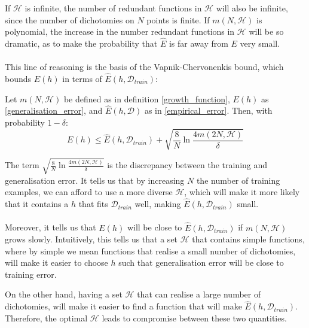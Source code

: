 If $\mathcal{H}$ is infinite, the number of redundant functions in $\mathcal{H}$ will also be infinite, since the number of dichotomies on $N$ points is finite. If $m(N, \mathcal{H})$ is polynomial, the increase in the number redundant functions in $\mathcal{H}$ will be so dramatic, as to make the probability that $\hat{E}$ is far away from $E$ very small.
\\\\
 This line of reasoning is the basis of the Vapnik-Chervonenkis bound, which bounds $E(h)$ in terms of $\hat{E}(h, \mathcal{D}_{train})$:

\begin{theorem}
	\label{vc_bound}
	Let $m(N, \mathcal{H})$ be defined as in definition \ref{growth_function}, $E(h)$ as \ref{generalisation_error}, and $\hat{E}(h, \mathcal{D})$ as in \ref{empirical_error}. Then, with probability $1 - \delta$:
	$$
	E(h) \leq \hat{E}(h, \mathcal{D}_{train}) + \sqrt{\frac{8}{N}\ln \frac{4m(2N, \mathcal{H})}{\delta}}
	$$
\end{theorem}

The term $\sqrt{\frac{8}{N}\ln \frac{4m(2N, \mathcal{H})}{\delta}}$ is the discrepancy between the training and generalisation error. It tells us that by increasing $N$ the number of training examples, we can afford to use a more diverse $\mathcal{H}$, which will make it more likely that it contains a $h$ that fits $\mathcal{D}_{train}$ well, making $\hat{E}(h, \mathcal{D}_{train})$ small.
\\\\
Moreover, it tells us that $E(h)$ will be close to $\hat{E}(h, \mathcal{D}_{train})$ if $m(N, \mathcal{H})$ grows slowly. Intuitively, this tells us that a set $\mathcal{H}$ that contains simple functions, where by simple we mean functions that realise a small number of dichotomies, will make it easier to choose $h$ such that generalisation error will be close to training error.

On the other hand, having a set $\mathcal{H}$ that can realise a large number of dichotomies, will make it easier to find a function that will make $\hat{E}(h, \mathcal{D}_{train})$. Therefore, the optimal $\mathcal{H}$ leads to compromise between these two quantities.